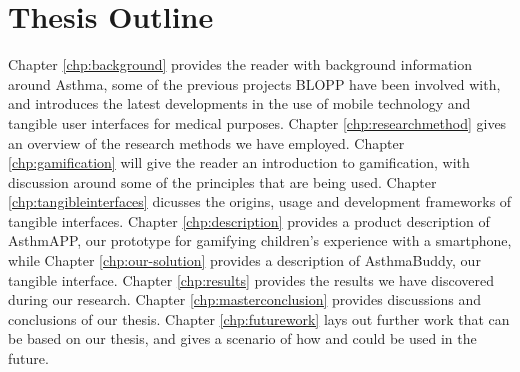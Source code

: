 \section{Thesis Outline}
\label{sec:thesisoutline}
Chapter \ref{chp:background} provides the reader with background information around Asthma, some of the previous projects BLOPP have been involved with, and introduces the latest developments in the use of mobile technology and tangible user interfaces for medical purposes.
Chapter \ref{chp:researchmethod} gives an overview of the research methods we have employed.  
Chapter \ref{chp:gamification} will give the reader an introduction to gamification, with discussion around some of the principles that are being used. 
Chapter \ref{chp:tangibleinterfaces} dicusses the origins, usage and development frameworks of tangible interfaces.
Chapter \ref{chp:description} provides a product description of AsthmAPP, our prototype for gamifying children's experience with a smartphone, while Chapter \ref{chp:our-solution} provides a description of AsthmaBuddy, our tangible interface.
Chapter \ref{chp:results} provides the results we have discovered during our research.
Chapter \ref{chp:masterconclusion} provides discussions and conclusions of our thesis.
Chapter \ref{chp:futurework} lays out further work that can be based on our thesis, and gives a scenario of how \ab{} and \app{} could be used in the future.            
